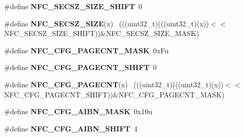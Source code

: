 \begin{DoxyCompactItemize}
\item 
\hypertarget{group___n_f_c___register___masks_gadc94e752f1603d7e6a6c9ed121cedf7c}{}\#define {\bfseries N\+F\+C\+\_\+\+S\+E\+C\+S\+Z\+\_\+\+S\+I\+Z\+E\+\_\+\+S\+H\+I\+F\+T}~0\label{group___n_f_c___register___masks_gadc94e752f1603d7e6a6c9ed121cedf7c}

\item 
\hypertarget{group___n_f_c___register___masks_gab9f635c74760d503794bc65ec0ae7e0c}{}\#define {\bfseries N\+F\+C\+\_\+\+S\+E\+C\+S\+Z\+\_\+\+S\+I\+Z\+E}(x)                                            ~(((uint32\+\_\+t)(((uint32\+\_\+t)(x))$<$$<$N\+F\+C\+\_\+\+S\+E\+C\+S\+Z\+\_\+\+S\+I\+Z\+E\+\_\+\+S\+H\+I\+F\+T))\&N\+F\+C\+\_\+\+S\+E\+C\+S\+Z\+\_\+\+S\+I\+Z\+E\+\_\+\+M\+A\+S\+K)\label{group___n_f_c___register___masks_gab9f635c74760d503794bc65ec0ae7e0c}

\item 
\hypertarget{group___n_f_c___register___masks_gab937537dfe01faecfdb1b7a0dc002653}{}\#define {\bfseries N\+F\+C\+\_\+\+C\+F\+G\+\_\+\+P\+A\+G\+E\+C\+N\+T\+\_\+\+M\+A\+S\+K}~0x\+Fu\label{group___n_f_c___register___masks_gab937537dfe01faecfdb1b7a0dc002653}

\item 
\hypertarget{group___n_f_c___register___masks_gaec5f7d397301153de7162f03f522aafb}{}\#define {\bfseries N\+F\+C\+\_\+\+C\+F\+G\+\_\+\+P\+A\+G\+E\+C\+N\+T\+\_\+\+S\+H\+I\+F\+T}~0\label{group___n_f_c___register___masks_gaec5f7d397301153de7162f03f522aafb}

\item 
\hypertarget{group___n_f_c___register___masks_gae39f20ab65f45a950d4addea96d47958}{}\#define {\bfseries N\+F\+C\+\_\+\+C\+F\+G\+\_\+\+P\+A\+G\+E\+C\+N\+T}(x)                                          ~(((uint32\+\_\+t)(((uint32\+\_\+t)(x))$<$$<$N\+F\+C\+\_\+\+C\+F\+G\+\_\+\+P\+A\+G\+E\+C\+N\+T\+\_\+\+S\+H\+I\+F\+T))\&N\+F\+C\+\_\+\+C\+F\+G\+\_\+\+P\+A\+G\+E\+C\+N\+T\+\_\+\+M\+A\+S\+K)\label{group___n_f_c___register___masks_gae39f20ab65f45a950d4addea96d47958}

\item 
\hypertarget{group___n_f_c___register___masks_ga8b08e4bd7e10506c3e46076c0651fe8f}{}\#define {\bfseries N\+F\+C\+\_\+\+C\+F\+G\+\_\+\+A\+I\+B\+N\+\_\+\+M\+A\+S\+K}~0x10u\label{group___n_f_c___register___masks_ga8b08e4bd7e10506c3e46076c0651fe8f}

\item 
\hypertarget{group___n_f_c___register___masks_gac8fc2ba1b2d53e8180f9ac8cf8382b0c}{}\#define {\bfseries N\+F\+C\+\_\+\+C\+F\+G\+\_\+\+A\+I\+B\+N\+\_\+\+S\+H\+I\+F\+T}~4\label{group___n_f_c___register___masks_gac8fc2ba1b2d53e8180f9ac8cf8382b0c}


\end{DoxyCompactItemize}
